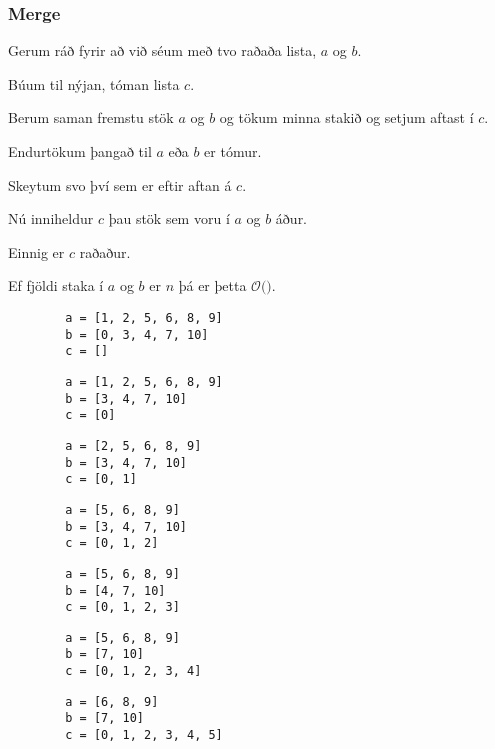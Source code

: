 {
    \frametitle{Merge}
    {
        \item<1-> Gerum ráð fyrir að við séum með tvo raðaða lista, $a$ og $b$.
        \item<2-> Búum til nýjan, tóman lista $c$.
        \item<3-> Berum saman fremstu stök $a$ og $b$ og tökum minna stakið og setjum aftast í $c$.
        \item<4-> Endurtökum þangað til $a$ eða $b$ er tómur.
        \item<5-> Skeytum svo því sem er eftir aftan á $c$.
        \item<6-> Nú inniheldur $c$ þau stök sem voru í $a$ og $b$ áður.
        \item<7-> Einnig er $c$ raðaður.
        \item<8-> Ef fjöldi staka í $a$ og $b$ er $n$ þá er þetta $\mathcal{O}($$)$.
    }
}

{ \begin{verbatim}
        a = [1, 2, 5, 6, 8, 9]
        b = [0, 3, 4, 7, 10]
        c = []
\end{verbatim} }

{ \begin{verbatim}
        a = [1, 2, 5, 6, 8, 9]
        b = [3, 4, 7, 10]
        c = [0]
\end{verbatim} }

{ \begin{verbatim}
        a = [2, 5, 6, 8, 9]
        b = [3, 4, 7, 10]
        c = [0, 1]
\end{verbatim} }

{ \begin{verbatim}
        a = [5, 6, 8, 9]
        b = [3, 4, 7, 10]
        c = [0, 1, 2]
\end{verbatim} }

{ \begin{verbatim}
        a = [5, 6, 8, 9]
        b = [4, 7, 10]
        c = [0, 1, 2, 3]
\end{verbatim} }

{ \begin{verbatim}
        a = [5, 6, 8, 9]
        b = [7, 10]
        c = [0, 1, 2, 3, 4]
\end{verbatim} }

{ \begin{verbatim}
        a = [6, 8, 9]
        b = [7, 10]
        c = [0, 1, 2, 3, 4, 5]
\end{verbatim} }

